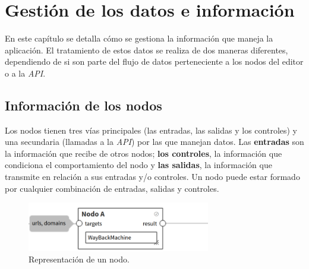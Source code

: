 

\chapter{Gestión de los datos e información} \label{cap:data}

En este capítulo se detalla cómo se gestiona la información que maneja la aplicación. El tratamiento de estos datos se realiza de dos maneras diferentes, dependiendo de si son parte del flujo de datos perteneciente a los nodos del editor o a la \textit{API}.\n


\section{Información de los nodos} \label{sec:nodedata}

Los nodos tienen tres vías principales (las entradas, las salidas y los controles)  y una secundaria (llamadas a la \textit{API}) por las que manejan datos. Las \textbf{entradas} son la información que recibe de otros nodos; \textbf{los controles}, la información que condiciona el comportamiento del nodo y \textbf{las salidas}, la información que transmite en relación a sus entradas y/o controles. Un nodo puede estar formado por cualquier combinación de entradas, salidas y controles.\sn

\begin{figure}[H]
    \centering
    \includegraphics[width=8cm]{img/tables/26_Ingredient.png}
    \caption{Representación de un nodo.}
    \label{fig:nodeskel}
\end{figure}

